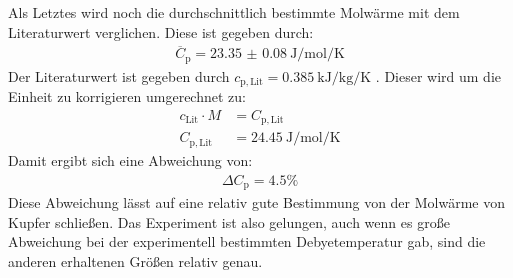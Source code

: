 \noindent Als Letztes wird noch die durchschnittlich bestimmte Molwärme mit dem Literaturwert verglichen. Diese ist gegeben durch:
\begin{align*}
  \overline{C}_\mathrm{p}=\SI{23.35(8)}{\joule\per\mole\per\kelvin}
\end{align*}
Der Literaturwert ist gegeben durch $c_\mathrm{p,Lit}=\SI{0.385}{\kilo\joule\per\kilo\gram\per\kelvin}$ \cite{Anleitung7}. Dieser wird um die Einheit zu korrigieren umgerechnet zu:
\begin{align*}
  c_\mathrm{Lit}\cdot M &= C_\mathrm{p,Lit} \\
  C_\mathrm{p,Lit} &= \SI{24.45}{\joule\per\mole\per\kelvin}
\end{align*}
Damit ergibt sich eine Abweichung von:
\begin{align*}
  \Delta C_\mathrm{p} = 4.5\%
\end{align*}
Diese Abweichung lässt auf eine relativ gute Bestimmung von der Molwärme von Kupfer schließen. Das Experiment ist also gelungen, auch wenn es große Abweichung bei der experimentell bestimmten
Debyetemperatur gab, sind die anderen erhaltenen Größen relativ genau.
